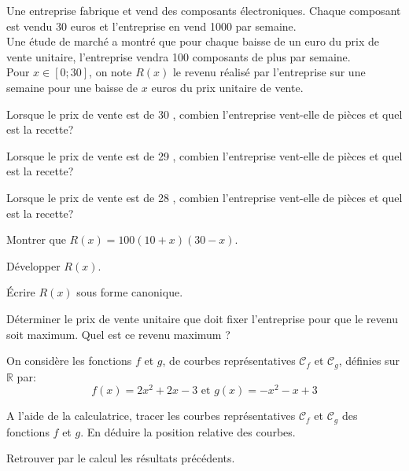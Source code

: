 \documentclass[12pt,a4paper]{article}  %
\begin{document}
Une entreprise fabrique et vend des composants électroniques. Chaque composant est vendu 30 euros et l'entreprise en vend 1000 par semaine.\\
Une étude de marché a montré que pour chaque baisse de un euro du prix de vente unitaire, l'entreprise vendra 100 composants de plus par semaine.\\
Pour $x \in[0 ; 30]$, on note $R(x)$ le revenu réalisé par l'entreprise sur une semaine pour une baisse de $x$ euros du prix unitaire de vente.
\begin{enumMet}
	\item \begin{enumMet}
		\item Lorsque le prix de vente est de 30 \EUR{}, combien l'entreprise vent-elle de pièces et quel est la recette? 
		\item Lorsque le prix de vente est de 29 \EUR{}, combien l'entreprise vent-elle de pièces et quel est la recette? 
		\item Lorsque le prix de vente est de 28 \EUR{}, combien l'entreprise vent-elle de pièces et quel est la recette? 
	\end{enumMet}
	\item Montrer que $R(x)=100(10+x)(30-x)$. \bareme{1,5}
	\item Développer $R(x)$. \bareme{1}
	\item Écrire $R(x)$ sous forme canonique. \bareme{1}
	\item Déterminer le prix de vente unitaire que doit fixer l'entreprise pour que le revenu soit maximum. Quel est ce revenu maximum ? \bareme{1}
\end{enumMet}


On considère les fonctions $f$ et $g$, de courbes représentatives $\mathscr{C}_f$ et $\mathscr{C}_g$, définies sur $\mathbb{R}$ par:
$$
f(x)=2 x^2+2 x-3 \text { et } g(x)=-x^2-x+3
$$

\begin{enumMet}
	\item A l'aide de la calculatrice, tracer les courbes représentatives $\mathscr{C}_f$ et $\mathscr{C}_g$ des fonctions $f$ et $g$. En déduire la position relative des courbes.  %
	\item Retrouver par le calcul les résultats précédents. \bareme{2}
\end{enumMet}
\end{document}
